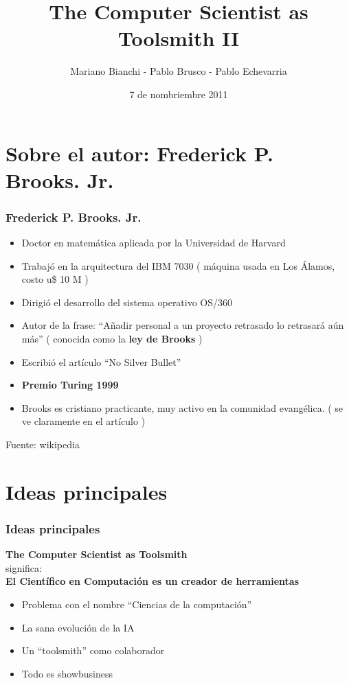 \documentclass{beamer}
\title{The Computer Scientist as Toolsmith II}
\author{Mariano Bianchi - Pablo Brusco - Pablo Echevarria }
\date{7 de nombriembre 2011}
\begin{document}
 \maketitle 
  

  \section{Sobre el autor: Frederick P. Brooks. Jr.}
    \begin{frame}
     \frametitle{Frederick P. Brooks. Jr.}
	\begin{itemize}
	\item Doctor en matemática aplicada por la Universidad de Harvard
	\item Trabajó en la arquitectura del IBM 7030 ( máquina usada en Los Álamos, costo u\$ 10 M )
	\item Dirigió el desarrollo del sistema operativo OS/360
	\item Autor de la frase: ``Añadir personal a un proyecto retrasado lo retrasará aún más'' ( conocida como la \textbf{ley de Brooks} )
 	\item Escribió el art\'iculo ``No Silver Bullet''
	\item \textbf{Premio Turing 1999}
	\item Brooks es cristiano practicante, muy activo en la comunidad evangélica. ( se ve claramente en el art\'iculo )
	\end{itemize}
	{\small Fuente: wikipedia}
     \end{frame}     

  \section{Ideas principales}
    \begin{frame}
     \frametitle{Ideas principales}
	\begin{block}{}
	    \begin{center}
	      \textbf{ The Computer Scientist as Toolsmith} \\ 
		significa: \\
	      \textbf{ El Científico en Computación es un creador de herramientas }
	    \end{center}	    
	\end{block}
      \begin{itemize}
	\item Problema con el nombre ``Ciencias de la computación''
	\item La sana evolución de la IA
	\item Un ``toolsmith'' como colaborador
	\item Todo es showbusiness
      \end{itemize}
    \end{frame}
\end{document}
